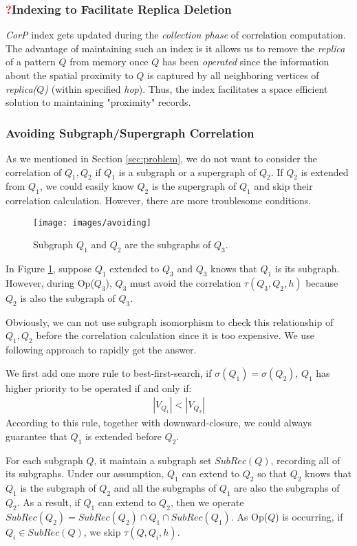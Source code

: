 \subsubsection{\textcolor{red}{?}Indexing to Facilitate Replica Deletion}
\label{subsubsec:replica-indexing}
\emph{CorP} index gets updated during the \emph{collection phase} of correlation
computation. The advantage of maintaining such an index is it allows us to
remove the \emph{replica} of a pattern $Q$ from memory once $Q$ has been
\emph{operated} since the information about the spatial proximity to $Q$ is captured by
all neighboring vertices of \emph{replica($Q$)} (within specified \emph{hop}).
Thus, the index facilitates a space efficient solution to maintaining
"proximity" records. 


\subsubsection{Avoiding Subgraph/Supergraph Correlation}\label{subsec:avoiding}
As we mentioned in Section \ref{sec:problem}, we do not want to consider the correlation of $Q_1,Q_2$ if $Q_1$ is a subgraph or a supergraph of $Q_2$. If $Q_2$ is extended from $Q_1$, we could easily know $Q_2$ is the supergraph of $Q_1$ and skip their correlation calculation. However, there are more troublesome conditions.


\begin{figure}[t!]
	\centering
	\texttt{[image: images/avoiding]}
	\vspace{-2mm}
	\caption{\scriptsize Subgraph $Q_1$ and $Q_2$ are the subgraphs of $Q_3$.}
	\label{fig:avoiding}
	\vspace{-4mm}
\end{figure}

\begin{exple}
	In Figure \ref{fig:avoiding}, suppose $Q_1$ extended to $Q_3$ and $Q_3$ knows that $Q_1$ is its subgraph. However, during {\sf Op($Q_3$)}, $Q_3$ must avoid the correlation $\tau(Q_3,Q_2,h)$ because $Q_2$ is also the subgraph of $Q_3$.
\end{exple}


Obviously, we can not use subgraph isomorphism to check this relationship of $Q_1,Q_2$ before the correlation calculation since it is too expensive. We use following approach to rapidly get the answer.
\par We first add one more rule to best-first-search, if $\sigma(Q_1)=\sigma(Q_2)$, $Q_1$ has higher priority to be operated if and only if:
\begin{align*} |V_{Q_1}|<|V_{Q_2}| \end{align*}
According to this rule, together with downward-closure, we could always
guarantee that $Q_1$ is extended before $Q_2$. \par For each subgraph $Q$, it
maintain a subgraph set $SubRec(Q)$, recording all of its subgraphs. Under our
assumption, $Q_1$ can extend to $Q_2$ so that $Q_2$ knows that $Q_1$ is the
subgraph of $Q_2$ and all the subgraphs of $Q_1$ are also the subgraphs of
$Q_2$. As a result, if $Q_1$ can extend to $Q_2$, then we operate
$SubRec(Q_2)=SubRec(Q_2)\cap Q_1\cap SubRec(Q_1)$. As {\sf Op($Q$)} is
occurring, if $Q_i\in SubRec(Q)$, we skip $\tau(Q,Q_i,h)$.

